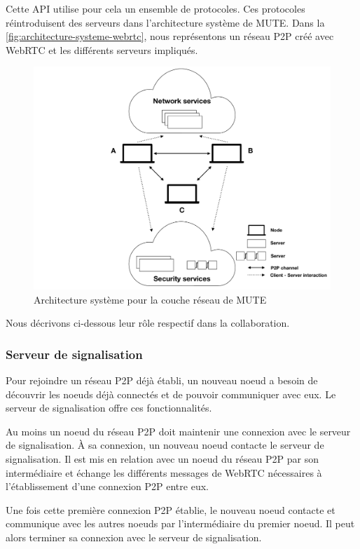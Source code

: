 Cette API utilise pour cela un ensemble de protocoles.
Ces protocoles réintroduisent des serveurs dans l'architecture système de MUTE.
Dans la \autoref{fig:architecture-systeme-webrtc}, nous représentons un réseau \ac{P2P} créé avec \ac{WebRTC} et les différents serveurs impliqués.

\begin{figure}[!ht]
  \centering
  \includegraphics[page=3, trim=7cm 3cm 4cm 2cm, clip, width=.7\linewidth]{img/mute-figures.pdf}
  \caption{Architecture système pour la couche réseau de MUTE}
  \label{fig:architecture-systeme-webrtc}
\end{figure}

Nous décrivons ci-dessous leur rôle respectif dans la collaboration.

\subsubsection{Serveur de signalisation}

Pour rejoindre un réseau \ac{P2P} déjà établi, un nouveau noeud a besoin de découvrir les noeuds déjà connectés et de pouvoir communiquer avec eux.
Le serveur de signalisation offre ces fonctionnalités.

Au moins un noeud du réseau \ac{P2P} doit maintenir une connexion avec le serveur de signalisation.
À sa connexion, un nouveau noeud contacte le serveur de signalisation.
Il est mis en relation avec un noeud du réseau \ac{P2P} par son intermédiaire et échange les différents messages de \ac{WebRTC} nécessaires à l'établissement d'une connexion \ac{P2P} entre eux.

Une fois cette première connexion \ac{P2P} établie, le nouveau noeud contacte et communique avec les autres noeuds par l'intermédiaire du premier noeud.
Il peut alors terminer sa connexion avec le serveur de signalisation.

